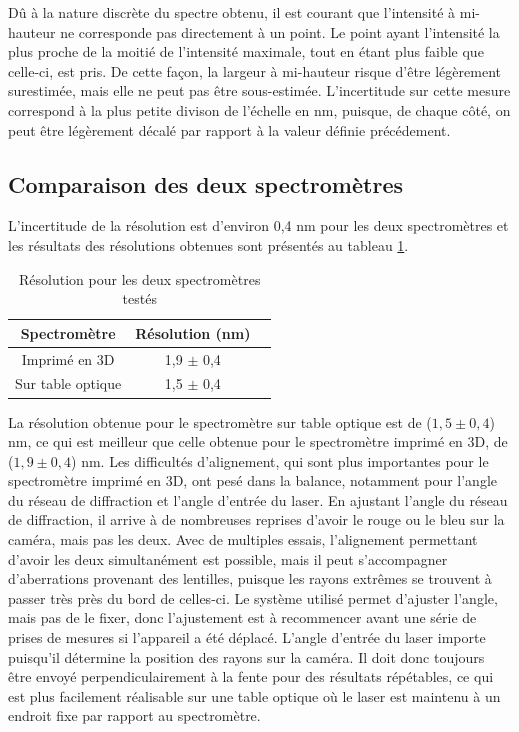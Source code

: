 \documentclass[11pt,letterpaper]{article}
\begin{document}
Dû à la nature discrète du spectre obtenu, il est courant que l'intensité à 
mi-hauteur ne corresponde pas directement à un point. Le point ayant l'intensité la plus proche
de la moitié de l'intensité maximale, tout en étant plus faible que celle-ci, est pris. De
cette façon, la largeur à mi-hauteur risque d'être légèrement surestimée, mais elle ne peut pas
être sous-estimée. L'incertitude sur cette mesure correspond à la plus petite divison de l'échelle en nm,
puisque, de chaque côté, on peut être légèrement décalé par rapport à la valeur définie précédement.

\subsection{Comparaison des deux spectromètres}

L'incertitude de la résolution est d'environ 0,4 nm pour les deux spectromètres et les résultats 
des résolutions obtenues sont présentés au tableau \ref{res_tab}.

\begin{table}[H]
  \centering
  \begin{tabular}{|c|c|c|}\hline
    Spectromètre & Résolution (nm) \\
    \hline
    Imprimé en 3D & 1,9 $\pm$ 0,4\\    \hline
    Sur table optique & 1,5 $\pm$ 0,4\\    \hline
  \end{tabular}
  \caption{Résolution pour les deux spectromètres testés}
  \label{res_tab}
\end{table}

La résolution obtenue pour le spectromètre sur table optique est de ($1,5 \pm 0,4$) nm, ce qui
est meilleur que celle obtenue pour le spectromètre imprimé en 3D, de ($1,9 \pm 0,4$) nm. Les difficultés d'alignement, qui sont plus importantes pour le spectromètre imprimé en 3D, ont
pesé dans la balance, notamment pour l'angle du réseau de diffraction et l'angle d'entrée du laser. 
En ajustant l'angle du réseau de diffraction, il arrive à de nombreuses reprises d'avoir 
le rouge ou le bleu sur la caméra, mais pas les deux.
Avec de multiples essais, l'alignement permettant d'avoir les deux simultanément est possible,
mais il peut s'accompagner d'aberrations provenant des lentilles, puisque les rayons extrêmes
se trouvent à passer très près du bord de celles-ci. Le système utilisé permet d'ajuster l'angle,
mais pas de le fixer, donc l'ajustement est à recommencer avant une série de prises de mesures si
l'appareil a été déplacé. 
L'angle d'entrée du laser importe puisqu'il détermine la position des rayons sur la caméra. Il doit
donc toujours être envoyé perpendiculairement à la fente pour des résultats répétables, ce qui est
plus facilement réalisable sur une table optique où le laser est maintenu à un endroit fixe par 
rapport au spectromètre.  
\end{document}
